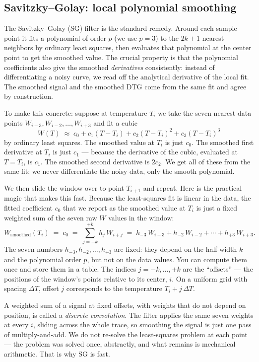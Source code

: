 \documentclass[11pt]{article}
\begin{document}
\subsection{Savitzky--Golay: local polynomial smoothing}

The Savitzky--Golay (SG) filter is the standard remedy. Around each
sample point it fits a polynomial of order $p$ (we use $p=3$) to the
$2k+1$ nearest neighbors by ordinary least squares, then evaluates
that polynomial at the center point to get the smoothed value. The
crucial property is that the polynomial coefficients also give the
smoothed \emph{derivatives} consistently: instead of differentiating a
noisy curve, we read off the analytical derivative of the local fit.
The smoothed signal and the smoothed DTG come from the same fit and
agree by construction.

To make this concrete: suppose at temperature $T_i$ we take the seven
nearest data points $W_{i-3}, W_{i-2}, \ldots, W_{i+3}$ and fit a
cubic
\[
  W(T) \;\approx\; c_0 + c_1 (T - T_i) + c_2 (T - T_i)^2 + c_3 (T - T_i)^3
\]
by ordinary least squares. The smoothed value at $T_i$ is just $c_0$.
The smoothed first derivative at $T_i$ is just $c_1$ --- because the
derivative of the cubic, evaluated at $T = T_i$, is $c_1$. The
smoothed second derivative is $2 c_2$. We get all of these from the
same fit; we never differentiate the noisy data, only the smooth
polynomial.

We then slide the window over to point $T_{i+1}$ and repeat. Here is
the practical magic that makes this fast. Because the least-squares
fit is linear in the data, the fitted coefficient $c_0$ that we
report as the smoothed value at $T_i$ is just a fixed weighted sum of
the seven raw $W$ values in the window:
\[
  W_{\mathrm{smoothed}}(T_i) \;=\; c_0
  \;=\; \sum_{j=-k}^{+k} h_j\, W_{i+j}
  \;=\; h_{-3}\,W_{i-3} + h_{-2}\,W_{i-2} + \cdots + h_{+3}\,W_{i+3}.
\]
The seven numbers $h_{-3}, h_{-2}, \ldots, h_{+3}$ are fixed: they
depend on the half-width $k$ and the polynomial order $p$, but not on
the data values. You can compute them once and store them in a table.
The indices $j = -k, \ldots, +k$ are the ``offsets'' --- the
positions of the window's points relative to its center, $i$. On a
uniform grid with spacing $\Delta T$, offset $j$ corresponds to the
temperature $T_i + j\,\Delta T$.

A weighted sum of a signal at fixed offsets, with weights that do not
depend on position, is called a \emph{discrete convolution}. The
filter applies the same seven weights at every $i$, sliding across
the whole trace, so smoothing the signal is just one pass of
multiply-and-add. We do not re-solve the least-squares problem at
each point --- the problem was solved once, abstractly, and what
remains is mechanical arithmetic. That is why SG is fast.
\end{document}
